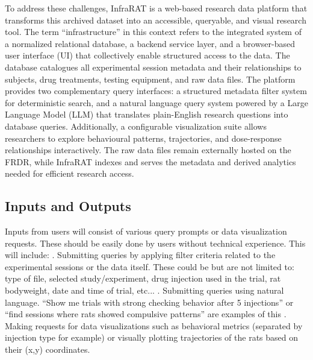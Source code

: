 \documentclass{article}
\begin{document}
\par{To address these challenges, InfraRAT is a web-based research data platform that transforms this
archived dataset into an accessible, queryable, and visual research tool. The term ``infrastructure'' in this
context refers to the integrated system of a normalized relational database, a backend service layer, and a
browser-based user interface (UI) that collectively enable structured access to the data. The database catalogues
all experimental session metadata and their relationships to subjects, drug treatments, testing equipment, and
raw data files. The platform provides two complementary query interfaces: a structured metadata filter system
for deterministic search, and a natural language query system powered by a Large Language Model (LLM) that
translates plain-English research questions into database queries. Additionally, a configurable visualization
suite allows researchers to explore behavioural patterns, trajectories, and dose-response relationships
interactively. The raw data files remain externally hosted on the FRDR, while InfraRAT indexes and serves the
metadata and derived analytics needed for efficient research access.}

\subsection{Inputs and Outputs}


\par{Inputs from users will consist of various query prompts or data visualization requests. These should be easily done
by users without technical experience. This will include: \newline \newline {}. Submitting queries by applying filter criteria related to the experimental sessions or the data itself.
These could be but are not limited to: type of file, selected study/experiment, drug injection used in the trial,
rat bodyweight, date and time of trial, etc... \newline \newline {}. Submitting queries using natural language. ``Show me trials with strong checking behavior after 5 injections''
or ``find sessions where rats showed compulsive patterns'' are examples of this \newline \newline {}. Making requests for data visualizations such as behavioral metrics (separated by injection type for example) or visually plotting trajectories of the rats
based on their (x,y) coordinates.}
\newline
\end{document}
